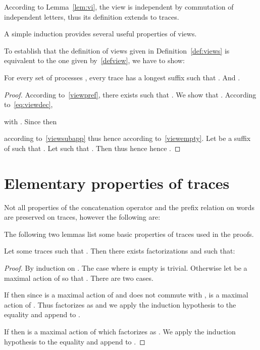 \documentclass[a4paper,UKenglish]{lipics-v2016}
\begin{document}
According to Lemma~\ref{lem:vi},
the view is independent by commutation of independent letters, thus its definition extends to traces.

A simple induction provides several useful properties of views.


To establish that the definition of views given in Definition~\ref{def:views} is equivalent
to the one given by~\eqref{defview},
we have to show:
\begin{lemma}
For every set of processes ,
every trace  has a longest suffix  such that .
And
.
\end{lemma}
\begin{proof}
According to~\eqref{viewpref},
there exists  such that .
We show that
.
According to~\eqref{eq:viewdec},

with .
Since 
then

according to~\eqref{viewsubapp}
thus  hence
 according to~\eqref{viewempty}.
Let  be a suffix of 
such that .
Let  such that . 
Then 
thus  hence  hence .
\end{proof}

\section{Elementary properties of traces}


Not all properties of the concatenation operator
and the prefix relation on words are preserved on traces,
however the following are:


The following two lemmas list some basic properties of traces used in the proofs.




\begin{lemma}\label{lem:facto}
Let  some traces such that
.
Then there exists factorizations
 and  such that:

\end{lemma}
\begin{proof}
By induction on .
The case where  is empty is trivial.
Otherwise let  be a maximal action of  so that
. There are two cases.

If 
then since  is a maximal action of 
and does not commute with ,
 is a maximal action of .
Thus  factorizes as 
and we apply the induction hypothesis to the equality
 and append  to .

If 
then  is a maximal action of  which factorizes as . We apply the induction hypothesis
to the equality  and append  to .
\end{proof}
\end{document}
